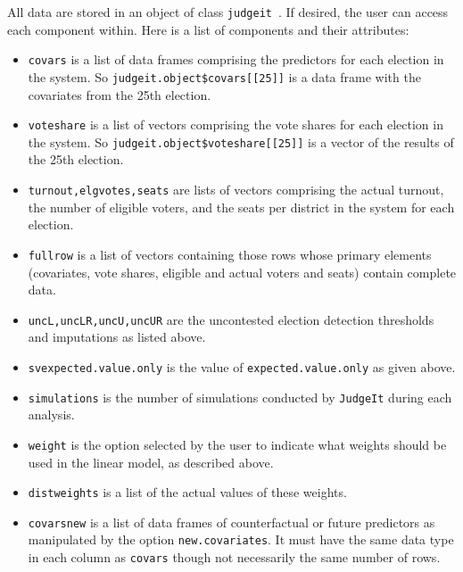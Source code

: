 \documentclass[oneside,letterpaper,titlepage]{article}
\newcommand{\jud}{\texttt{judgeit}\ }
\begin{document}
All data are stored in an object of class \jud. If desired,
the user can access each component within. Here is a list of
components and their attributes:

\begin{itemize}

\item \texttt{covars} is a list of data frames comprising the
  predictors for each election in the system. So
  \texttt{judgeit.object\$covars[[25]]} is a data frame with the
  covariates from the 25th election.

\item \texttt{voteshare} is a list of vectors comprising the vote
  shares for each election in the system. So
  \texttt{judgeit.object\$voteshare[[25]]} is a vector of the results
  of the 25th election.

\item \texttt{turnout,elgvotes,seats} are lists of vectors
  comprising the actual turnout, the number of eligible voters, and
  the seats per district in the system for each election.

\item \texttt{fullrow} is a list of vectors containing those rows
  whose primary elements (covariates, vote shares, eligible and actual
  voters and seats) contain complete data.

\item \texttt{uncL,uncLR,uncU,uncUR} are the uncontested election
  detection thresholds and imputations as listed above.

\item \texttt{svexpected.value.only} is the value of \texttt{expected.value.only}
as given above.

\item \texttt{simulations} is the number of simulations conducted by
  \texttt{JudgeIt} during each analysis.

\item \texttt{weight} is the option selected by the user to indicate
  what weights should be used in the linear model, as described above.

\item \texttt{distweights} is a list of the actual values of these
  weights.

\item \texttt{covarsnew} is a list of data frames of counterfactual or
  future predictors as manipulated by the option
  \texttt{new.covariates}. It must have the same data type in each column as \texttt{covars} though not necessarily the same number of rows.


\end{itemize}
\end{document}
